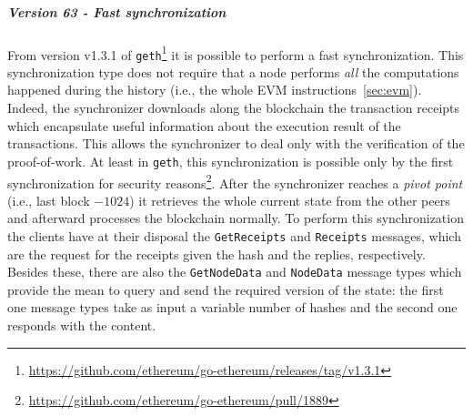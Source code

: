 \subparagraph{Version 63 - Fast synchronization}
From version v1.3.1 of
\texttt{geth}\footnote{\url{https://github.com/ethereum/go-ethereum/releases/tag/v1.3.1}}
it is possible to perform a fast synchronization. This synchronization type does
not require that a node performs \emph{all} the computations happened during the
history (i.e., the whole EVM instructions~\autoref{sec:evm}). Indeed, the
synchronizer downloads along the blockchain the transaction receipts which
encapsulate useful information about the execution result of the transactions.
This allows the synchronizer to deal only with the verification of the
proof-of-work. At least in \texttt{geth}, this synchronization is possible only
by the first synchronization for security
reasons\footnote{\url{https://github.com/ethereum/go-ethereum/pull/1889}}. After
the synchronizer reaches a \textit{pivot point} (i.e., last block $- 1024$) it
retrieves the whole current state from the other peers and afterward processes
the blockchain normally. To perform this synchronization the clients have at their disposal the
\texttt{GetReceipts} and \texttt{Receipts} messages, which are the request for
the receipts given the hash and the replies, respectively. Besides these, there
are also the \texttt{GetNodeData} and \texttt{NodeData} message types which
provide the mean to query and send the required version of the state: the first
one message types take as input a variable number of hashes and the second one
responds with the content.
